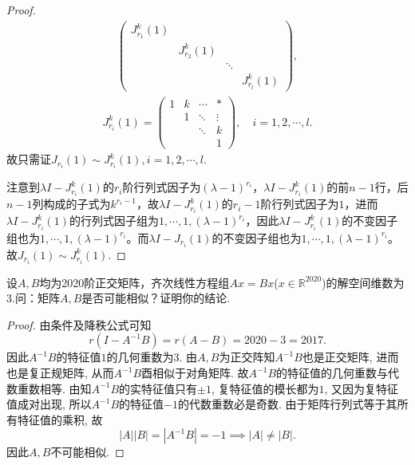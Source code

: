 \documentclass[../../main.tex]{subfiles}%
\begin{document}
\begin{proof}
\begin{align*}
\begin{pmatrix}
J_{r_1}^k(1) & & & \\
& J_{r_2}^k(1) & & \\
& & \ddots & \\
& & & J_{r_l}^k(1)
\end{pmatrix},
\end{align*}
\begin{align*}
J_{r_i}^k(1)=\begin{pmatrix}
1 & k & \cdots & * \\
& 1 & \ddots & \vdots \\
& & \ddots & k \\
& & & 1
\end{pmatrix},\quad i=1,2,\cdots,l.
\end{align*}
故只需证$J_{r_i}(1)\sim J_{r_i}^k(1),i=1,2,\cdots,l.$

注意到$\lambda I-J_{r_i}^k(1)$的$r_i$阶行列式因子为$(\lambda-1)^{r_i}$，$\lambda I-J_{r_i}^k(1)$的前$n-1$行，后$n-1$列构成的子式为$k^{r_i-1}$，故$\lambda I-J_{r_i}^k(1)$的$r_i-1$阶行列式因子为$1$，进而$\lambda I-J_{r_i}^k(1)$的行列式因子组为$1,\cdots,1,(\lambda-1)^{r_i}$，因此$\lambda I-J_{r_i}^k(1)$的不变因子组也为$1,\cdots,1,(\lambda-1)^{r_i}$。而$\lambda I-J_{r_i}(1)$的不变因子组也为$1,\cdots,1,(\lambda-1)^{r_i}$。故$J_{r_i}(1)\sim J_{r_i}^k(1)$.
\end{proof}

\begin{example}
设$A,B$均为2020阶正交矩阵，齐次线性方程组$Ax=Bx$($x \in \mathbb{R}^{2020}$)的解空间维数为3.问：矩阵$A,B$是否可能相似？证明你的结论.
\end{example}
\begin{proof}
由条件及降秩公式可知
$$r(I - A^{-1}B) = r(A - B) = 2020 - 3 = 2017.$$
因此$A^{-1}B$的特征值$1$的几何重数为$3$. 由$A,B$为正交阵知$A^{-1}B$也是正交矩阵, 进而也是复正规矩阵, 从而$A^{-1}B$酉相似于对角矩阵. 故$A^{-1}B$的特征值的几何重数与代数重数相等.
由知$A^{-1}B$的实特征值只有$\pm 1$, 复特征值的模长都为$1$, 又因为复特征值成对出现, 所以$A^{-1}B$的特征值$-1$的代数重数必是奇数.
由于矩阵行列式等于其所有特征值的乘积, 故
$$|A||B| = |A^{-1}B| = -1 \implies |A| \neq |B|.$$
因此$A,B$不可能相似.
\end{proof}
\end{document}
